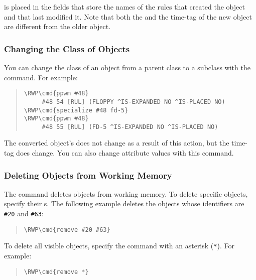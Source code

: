 is placed in the fields that store the names of the rules
that created the object and that last modified it. Note that both the
 and the time-tag of the new object are different from
the older object.

\subsubsection{Changing the Class of Objects}

You can change the class of an object from a parent class to a
subclass with the  command. For example:

\begin{quote}
\begin{Verbatim}[commandchars=\\\{\}]
\RWP\cmd{ppwm #48}
     #48 54 [RUL] (FLOPPY ^IS-EXPANDED NO ^IS-PLACED NO)
\RWP\cmd{specialize #48 fd-5}
\RWP\cmd{ppwm #48}
     #48 55 [RUL] (FD-5 ^IS-EXPANDED NO ^IS-PLACED NO)
\end{Verbatim}
\end{quote}

\begin{note}
  The converted object's  does not change as a result
  of this action, but the time-tag does change. You can also change
  attribute values with this command.
\end{note}

\subsubsection{Deleting Objects from Working Memory}

The  command deletes objects from working memory. To delete
specific objects, specify their s. The following
example deletes the objects whose identifiers are \verb|#20| and
\verb|#63|:

\begin{quote}
\begin{Verbatim}[commandchars=\\\{\}]
\RWP\cmd{remove #20 #63}
\end{Verbatim}
\end{quote}

To delete all visible objects, specify the command with an asterisk
(\verb|*|). For example:

\begin{quote}
\begin{Verbatim}[commandchars=\\\{\}]
\RWP\cmd{remove *}
\end{Verbatim}
\end{quote}

